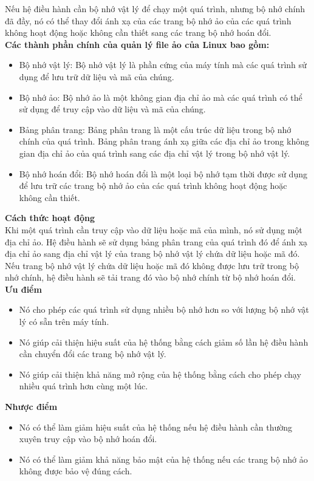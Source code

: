\documentclass[12pt,a4paper]{article}
\begin{document}
Nếu hệ điều hành cần bộ nhớ vật lý để chạy một quá trình, nhưng bộ nhớ chính đã đầy, nó có thể thay đổi ánh xạ của các trang bộ nhớ ảo của các quá trình không hoạt động hoặc không cần thiết sang các trang bộ nhớ hoán đổi.\\

\textbf{Các thành phần chính của quản lý file ảo của Linux bao gồm:}
\begin{itemize}
	\item Bộ nhớ vật lý: Bộ nhớ vật lý là phần cứng của máy tính mà các quá trình sử dụng để lưu trữ dữ liệu và mã của chúng.
	\item Bộ nhớ ảo: Bộ nhớ ảo là một không gian địa chỉ ảo mà các quá trình có thể sử dụng để truy cập vào dữ liệu và mã của chúng.
	\item Bảng phân trang: Bảng phân trang là một cấu trúc dữ liệu trong bộ nhớ chính của quá trình. Bảng phân trang ánh xạ giữa các địa chỉ ảo trong không gian địa chỉ ảo của quá trình sang các địa chỉ vật lý trong bộ nhớ vật lý.
	\item Bộ nhớ hoán đổi: Bộ nhớ hoán đổi là một loại bộ nhớ tạm thời được sử dụng để lưu trữ các trang bộ nhớ ảo của các quá trình không hoạt động hoặc không cần thiết.
\end{itemize}
\textbf{Cách thức hoạt động}\\

Khi một quá trình cần truy cập vào dữ liệu hoặc mã của mình, nó sử dụng một địa chỉ ảo. Hệ điều hành sẽ sử dụng bảng phân trang của quá trình đó để ánh xạ địa chỉ ảo sang địa chỉ vật lý của trang bộ nhớ vật lý chứa dữ liệu hoặc mã đó.\\

Nếu trang bộ nhớ vật lý chứa dữ liệu hoặc mã đó không được lưu trữ trong bộ nhớ chính, hệ điều hành sẽ tải trang đó vào bộ nhớ chính từ bộ nhớ hoán đổi.\\

\textbf{Ưu điểm}\\

\begin{itemize}
	\item Nó cho phép các quá trình sử dụng nhiều bộ nhớ hơn so với lượng bộ nhớ vật lý có sẵn trên máy tính.
	\item Nó giúp cải thiện hiệu suất của hệ thống bằng cách giảm số lần hệ điều hành cần chuyển đổi các trang bộ nhớ vật lý.
	\item Nó giúp cải thiện khả năng mở rộng của hệ thống bằng cách cho phép chạy nhiều quá trình hơn cùng một lúc.
\end{itemize}
\textbf{Nhược điểm}\\
\begin{itemize}
	\item Nó có thể làm giảm hiệu suất của hệ thống nếu hệ điều hành cần thường xuyên truy cập vào bộ nhớ hoán đổi.
	\item Nó có thể làm giảm khả năng bảo mật của hệ thống nếu các trang bộ nhớ ảo không được bảo vệ đúng cách.
\end{itemize}
\end{document}
